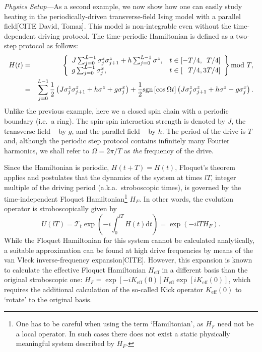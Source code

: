 \documentclass{SciPost}
\newcommand\0{\scalebox{-1}[1]{0}}
\begin{document}
\emph{Physics Setup---}As a second example, we now show how one can easily study heating in the periodically-driven transverse-field Ising model with a parallel field[CITE David, Tomaz]. This model is non-integrable even without the time-dependent driving protocol. The time-periodic Hamiltonian is defined as a two-step protocol as follows:  
\begin{eqnarray}
\label{eq:Floquet_H}
H(t) &=& \left\{ \begin{array}{cl}
J\sum_{j=0}^{L-1} \sigma^z_j\sigma^z_{j+1} + h\sum_{j=0}^{L-1}\sigma^z, &  t\in[-T/4,\phantom{3}T/4] \\
\kern-8em g\sum_{j=0}^{L-1} \sigma^x_j, &  t\in[\phantom{-} T/4,3T/4]
\end{array} \right\}  \mathrm{mod}\ T,\nonumber\\
&=& \sum_{j=0}^{L-1} \frac{1}{2}\left(J \sigma^z_j\sigma^z_{j+1} + h\sigma^z + g\sigma^x_j\right)
+ \frac{1}{2}\text{sgn}\left[\cos\Omega t\right]\left( J \sigma^z_j\sigma^z_{j+1} + h\sigma^z - g\sigma^x_j \right).
\end{eqnarray}
Unlike the previous example, here we a closed spin chain with a periodic boundary (i.e.~a ring). The spin-spin interaction strength is denoted by $J$, the transverse field -- by $g$, and the parallel field -- by $h$. The period of the drive is $T$ and, although the periodic step protocol contains infinitely many Fourier harmonics, we shall refer to $\Omega=2\pi/T$ as \emph{the} frequency of the drive.

Since the Hamiltonian is periodic, $H(t+T)=H(t)$, Floquet's theorem applies and postulates that the dynamics of the system at times $lT$, integer multiple of the driving period (a.k.a.~stroboscopic times), is governed by the time-independent Floquet Hamiltonian\footnote{One has to be careful when using the term `Hamiltonian', as $H_F$ need not be a local operator. In such cases there does not exist a static physically meaningful system described by $H_F$.} $H_F$. In other words, the evolution operator is stroboscopically given by
\begin{equation}
U(lT) = \mathcal{T}_t\exp\left(-i\int^{lT}_0H(t)\mathrm{d}t\right) = \exp(-ilT H_F).
\end{equation}
While the Floquet Hamiltonian for this system cannot be calculated analytically, a suitable approximation can be found at high drive frequencies by means of the van Vleck inverse-frequency expansion[CITE]. However, this expansion is known to calculate the effective Floquet Hamiltonian $H_\mathrm{eff}$ in a different basis than the original stroboscopic one: $H_F = \exp[-i K_\mathrm{eff}(0)] H_\mathrm{eff}\exp[i K_\mathrm{eff}(0)]$, which requires the additional calculation of the so-called Kick operator $K_\mathrm{eff}(0)$ to `rotate' to the original basis. 
\end{document}
